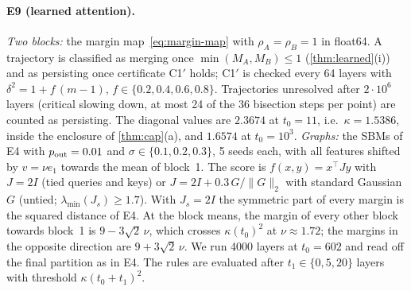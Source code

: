 \paragraph{E9 (learned attention).} \emph{Two blocks:} the margin map~\eqref{eq:margin-map} with $\rho_A=\rho_B=1$ in float64. A trajectory is
classified as merging once $\min(M_A,M_B)\le1$ (\cref{thm:learned}(i)) and as persisting once certificate C1$'$ holds; C1$'$ is checked every 64
layers with $\delta^2=1+f\,(m-1)$, $f\in\{0.2,0.4,0.6,0.8\}$. Trajectories unresolved after $2\cdot10^6$ layers (critical slowing down, at most 24 of
the 36 bisection steps per point) are counted as persisting. The diagonal values are $2.3674$ at $t_0=11$, i.e.\ $\kappa=1.5386$, inside the enclosure
of \cref{thm:cap}(a), and $1.6574$ at $t_0=10^3$.
\emph{Graphs:} the SBMs of E4 with $p_{\rm out}=0.01$ and $\sigma\in\{0.1,0.2,0.3\}$, 5 seeds each, with all features shifted by $v=\nu e_1$ towards the mean
of block~1. The score is $f(x,y)=x^\top Jy$ with $J=2I$ (tied queries and keys) or $J=2I+0.3\,G/\|G\|_2$ with standard Gaussian $G$ (untied;
$\lambda_{\min}(J_s)\ge1.7$). With $J_s=2I$ the symmetric part of every margin is the squared distance of E4. At the block means, the margin of every
other block towards block~1 is $9-3\sqrt2\,\nu$, which crosses $\kappa(t_0)^2$ at $\nu\approx1.72$; the margins in the opposite direction are
$9+3\sqrt2\,\nu$. We run 4000 layers at $t_0=602$ and read off the final partition as in E4. The rules are evaluated after $t_1\in\{0,5,20\}$ layers
with threshold $\kappa(t_0+t_1)^2$.


